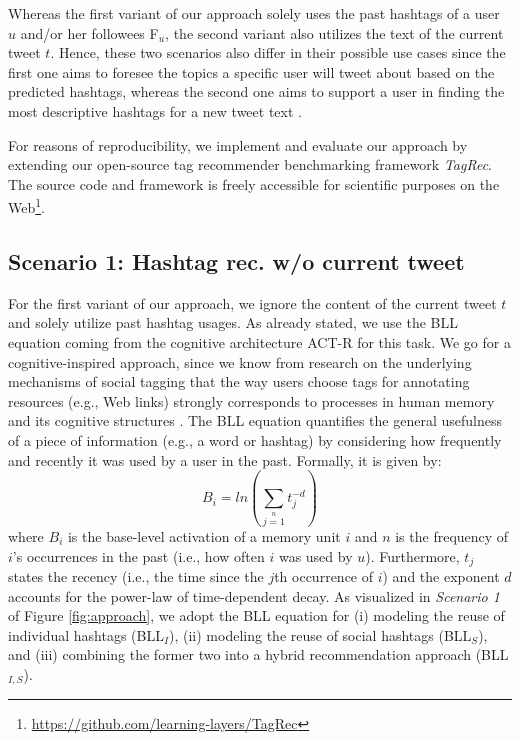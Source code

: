 \documentclass{sig-alternate-05-2015}
\begin{document}
Whereas the first variant of our approach solely uses the past hashtags of a user $u$ and/or her followees F$_u$, the second variant also utilizes the text of the current tweet $t$. Hence, these two scenarios also differ in their possible use cases since the first one aims to foresee the topics a specific user will tweet about based on the predicted hashtags, whereas the second one aims to support a user in finding the most descriptive hashtags for a new tweet text \cite{Godin2013}.

For reasons of reproducibility, we implement and evaluate our approach by extending our open-source tag recommender benchmarking framework \textit{TagRec}. The source code and framework is freely accessible for scientific purposes on the Web\footnote{\url{https://github.com/learning-layers/TagRec}}.

\subsection{Scenario 1: Hashtag rec. w/o current tweet}
For the first variant of our approach, we ignore the content of the current tweet $t$ and solely utilize past hashtag usages. As already stated, we use the BLL equation coming from the cognitive architecture ACT-R \cite{anderson2004integrated,anderson_reflections_1991} for this task. We go for a cognitive-inspired approach, since we know from research on the underlying mechanisms of social tagging that the way users choose tags for annotating resources (e.g., Web links) strongly corresponds to processes in human memory and its cognitive structures \cite{cress2013collective,seitlinger2015verbatim}. The BLL equation quantifies the general usefulness of a piece of information (e.g., a word or hashtag) by considering how frequently and recently it was used by a user in the past. Formally, it is given by:
\begin{equation}\label{eq:bll}
    B_i = ln(\sum\limits_{j = 1}\limits^{n}{t_{j}^{-d}})
\end{equation}
where $B_i$ is the base-level activation of a memory unit $i$ and $n$ is the frequency of $i$'s occurrences in the past (i.e., how often $i$ was used by $u$). Furthermore, $t_j$ states the recency (i.e., the time since the $j$th occurrence of $i$) and the exponent $d$ accounts for the power-law of time-dependent decay. As visualized in \textit{Scenario 1}{} of Figure \ref{fig:approach}, we adopt the BLL equation for (i) modeling the reuse of individual hashtags (BLL$_{I}$), (ii) modeling the reuse of social hashtags (BLL$_{S}$), and (iii) combining the former two into a hybrid recommendation approach (BLL$_{I,S}$).
\end{document}

